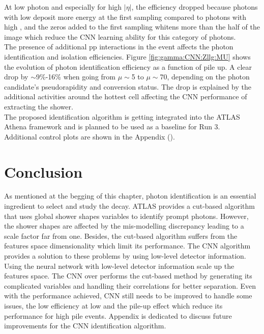At low photon \eT and especially for high $|\eta|$, the efficiency dropped because photons with low \eT deposit more energy at the first sampling compared to photons with high \eT, and the zeros added to the first sampling whitens more than the half of the image which reduce the CNN learning ability for this category of photons. \\
The presence of additional pp interactions in the event affects the photon identification and isolation efficiencies. Figure \ref{fig:gamma:CNN:Zllg:MU} shows the evolution of photon identification efficiency as a function of pile up. A clear drop by $\sim$9\%-16\% when going from $\mu\sim$5 to $\mu\sim$70, depending on the photon candidate's pseudorapidity and conversion status. The drop is explained by the additional activities around the hottest cell affecting the CNN performance of extracting the shower. \\
The proposed identification algorithm is getting integrated into the ATLAS Athena framework and is planned to be used as a baseline for Run 3. \\
Additional control plots are shown in the Appendix ().

\section{Conclusion}
\label{gamma:conc}



As mentioned at the begging of this chapter, photon identification is an essential ingredient to select and study the \HHyybb decay. ATLAS provides a cut-based algorithm that uses global shower shapes variables to identify prompt photons. However, the shower shapes are affected by the mis-modelling discrepancy leading to a scale factor far from one. Besides, the cut-based algorithm suffers from the features space dimensionality which limit its performance. The CNN algorithm provides a solution to these problems by using low-level detector information. Using the neural network with low-level detector information scale up the features space. The CNN over performs the cut-based method by generating its complicated variables and handling their correlations for better separation. Even with the performance achieved, CNN still needs to be improved to handle some issues, the low efficiency at low \eT and the pile-up effect which reduce its performance for high pile events. Appendix is dedicated to discuss future improvements for the CNN identification algorithm. 
